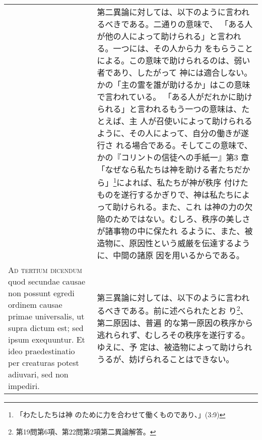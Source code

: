 \documentclass[10pt]{jsarticle} %
\begin{document}
\begin{longtable}{p{21em}p{21em}}
&

第二異論に対しては、以下のように言われるべきである。二通りの意味で、
「ある人が他の人によって助けられる」と言われる。一つには、その人から力
をもらうことによる。この意味で助けられるのは、弱い者であり、したがって
神には適合しない。かの「主の霊を誰が助けるか」はこの意味で言われている。
「ある人がだれかに助けられる」と言われるもう一つの意味は、たとえば、主
人が召使いによって助けられるように、その人によって、自分の働きが遂行さ
れる場合である。そしてこの意味で、かの『コリントの信徒への手紙一』第3
章「なぜなら私たちは神を助ける者たちだから」\footnote{「わたしたちは神
のために力を合わせて働くものであり、」(3:9)}によれば、私たちが神が秩序
付けたものを遂行するかぎりで、神は私たちによって助けられる。また、これ
は神の力の欠陥のためではない。むしろ、秩序の美しさが諸事物の中に保たれ
るように、また、被造物に、原因性という威厳を伝達するように、中間の諸原
因を用いるからである。



\\


{\scshape Ad tertium dicendum} quod secundae causae non
possunt egredi ordinem causae primae universalis, ut supra dictum est;
sed ipsum exequuntur. Et ideo praedestinatio per creaturas potest
adiuvari, sed non impediri.

&


第三異論に対しては、以下のように言われるべきである。前に述べられたとお
り\footnote{第19問第6項、第22問第2項第二異論解答。}、第二原因は、普遍
的な第一原因の秩序から逃れられず、むしろその秩序を遂行する。ゆえに、予
定は、被造物によって助けられうるが、妨げられることはできない。

\end{longtable}
\end{document}
